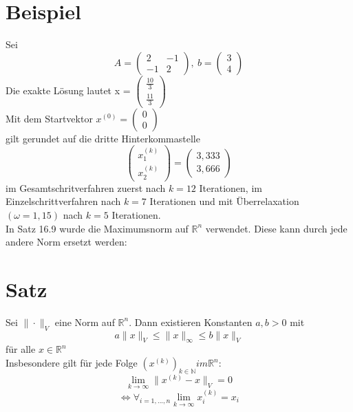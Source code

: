 \documentclass{scrbook}
\begin{document}
\section{Beispiel}
Sei
\[A= \left(
\begin{array}{cc}
2&-1\\
-1&2
\end{array}
\right)
,\ b = \left(
\begin{array}{c}
3\\4
\end{array}
\right)\]
Die exakte Lösung lautet x = $\left(
\begin{array}{c}
\frac{10}{3}\\\frac{11}{3}
\end{array}
\right)$\\
Mit dem Startvektor $x^{(0)} = \left(
\begin{array}{c}
0\\0
\end{array}
\right)$\\
gilt gerundet auf die dritte Hinterkommastelle
\[\left(
\begin{array}{c}
x_1^{(k)}\\x_2^{(k)}
\end{array}
\right)=\left(
\begin{array}{c}
3,333\\3,666
\end{array}
\right)\]
im Gesamtschritverfahren zuerst nach $k = 12$ Iterationen, im Einzelschrittverfahren nach $k=7$ Iterationen und mit Überrelaxation $(\omega=1,15)$ nach $k=5$ Iterationen.\\
In Satz 16.9 wurde die Maximumsnorm auf $\mathbb{R}^n$ verwendet. Diese kann durch jede andere Norm ersetzt werden:
\section{Satz} Sei $\|\cdot\|_V$ eine Norm auf $\mathbb{R}^n$. Dann existieren Konstanten $a, b > 0$ mit 
\[a\|x\|_V \leq \|x\|_\infty \leq b\|x\|_V\]
für alle $x \in \mathbb{R}^n $ \\
Insbesondere gilt für jede Folge $(x^{(k)})_{k \in \mathbb{N}} im \mathbb{R}^n: $
\[ \lim_{k \to \infty} \|x^{(k)}-x \|_V = 0\]
\[\Leftrightarrow \forall_{i=1,...,n} \lim_{k\to\infty} x^{(k)}_i = x_i\]
\end{document}
